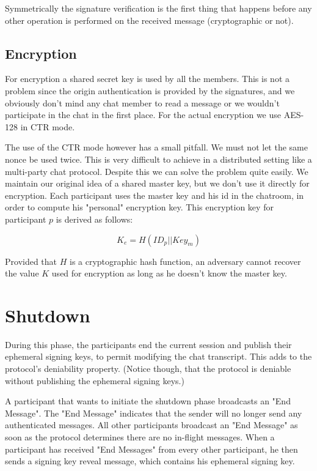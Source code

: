 \documentclass[12pt,titlepage,a4paper]{article}
\begin{document}
{Symmetrically the signature verification is the first thing that happens before
any other operation is performed on the received message (cryptographic or not).

\subsection{Encryption}

For encryption a shared secret key is used by all the members. This is not a
problem since the origin authentication is provided by the signatures, and
we obviously don't mind any chat member to read a message or we wouldn't
participate in the chat in the first place. For the actual encryption we
use AES-128 in CTR mode.

The use of the CTR mode however has a small pitfall. We must not let the same
nonce be used twice. This is very difficult to achieve in a distributed setting
like a multi-party chat protocol. Despite this we can solve the problem quite
easily. We maintain our original idea of a shared master key, but we don't use
it directly for encryption. Each participant uses the master key and his id in
the chatroom, in order to compute his "personal" encryption key. This encryption
key for participant $p$ is derived as follows:

\[
    K_e = H(ID_p || Key_m)
\]

Provided that $H$ is a cryptographic hash function, an adversary cannot recover
the value $K$ used for encryption as long as he doesn't know the master key.
}
\section{Shutdown}

During this phase, the participants end the current session and publish their
ephemeral signing keys, to permit modifying the chat transcript. This adds to
the protocol's deniability property. (Notice though, that the protocol is
deniable without publishing the ephemeral signing keys.)

A participant that wants to initiate the shutdown phase broadcasts an
"End Message". The "End Message" indicates that the sender will no longer send
any authenticated messages. All other participants broadcast an "End Message"
as soon as the protocol determines there are no in-flight messages. When a
participant has received "End Messages" from every other participant, he then
sends a signing key reveal message, which contains his ephemeral signing key.
\end{document}
